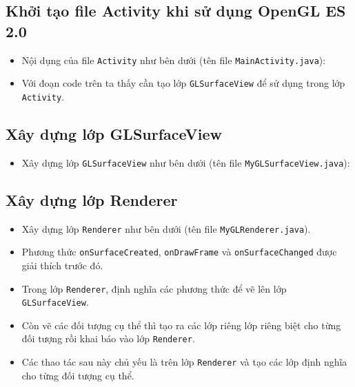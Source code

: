 \documentclass[13pt,a4paper]{extreport}
\begin{document}
\subsection{Khởi tạo file Activity khi sử dụng OpenGL ES 2.0}
\label{Sec:MainActivity}
	\begin{itemize}
		\item Nội dụng của file \verb|Activity| như bên dưới (tên file \verb|MainActivity.java|):
			
				
		\item Với đoạn code trên ta thấy cần tạo lớp \verb|GLSurfaceView| để sử dụng trong lớp \verb|Activity|.
	\end{itemize}

\subsection{Xây dựng lớp GLSurfaceView}
\label{Sec:GLSurfaceView}
	\begin{itemize}
		\item Xây dựng lớp \verb|GLSurfaceView| như bên dưới (tên file \verb|MyGLSurfaceView.java|):
			
	\end{itemize}
	
\subsection{Xây dựng lớp Renderer}
\label{Sec:Renderer}
\begin{itemize}
		\item Xây dựng lớp \verb|Renderer| như bên dưới (tên file \verb|MyGLRenderer.java|).
			
		
		\item Phương thức \verb|onSurfaceCreated|, \verb|onDrawFrame| và \verb|onSurfaceChanged| được giải thích trước đó.
		
		\item Trong lớp \verb|Renderer|, định nghĩa các phương thức để vẽ lên lớp \verb|GLSurfaceView|.
		
		\item Còn vẽ các đối tượng cụ thể thì tạo ra các lớp riêng lớp riêng biệt cho từng đối tượng rồi khai báo vào lớp \verb|Renderer|.
		
		\item Các thao tác sau này chủ yếu là trên lớp \verb|Renderer| và tạo các lớp định nghĩa cho từng đối tượng cụ thể.
	\end{itemize}
\end{document}
